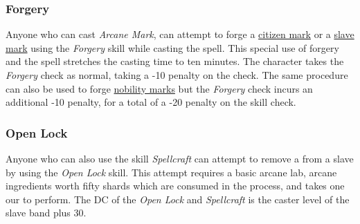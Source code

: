 \subsubsection{Forgery}
\label{sec:Forgery}

Anyone who can cast \emph{Arcane Mark}, can attempt to forge a
\hyperref[sec:Citizen Mark]{citizen mark} or a \hyperref[sec:Slave Mark]{slave
mark} using the \emph{Forgery} skill while casting the spell. This special
use of forgery and the spell stretches the casting time to ten minutes. The
character takes the \emph{Forgery} check as normal, taking a -10 penalty on
the check. The same procedure can also be used to forge \hyperref[sec:Nobility
Mark]{nobility marks} but the \emph{Forgery} check incurs an additional -10
penalty, for a total of a -20 penalty on the skill check.

\subsubsection{Open Lock}
\label{sec:Open Lock}

Anyone who can also use the skill \emph{Spellcraft} can attempt to remove
a  from a slave by using the \emph{Open Lock} skill.
This attempt requires a basic arcane lab, arcane ingredients worth fifty
shards which are consumed in the process, and takes one our to perform.
The DC of the \emph{Open Lock} and \emph{Spellcraft} is the caster level
of the slave band plus 30.

\FloatBarrier

